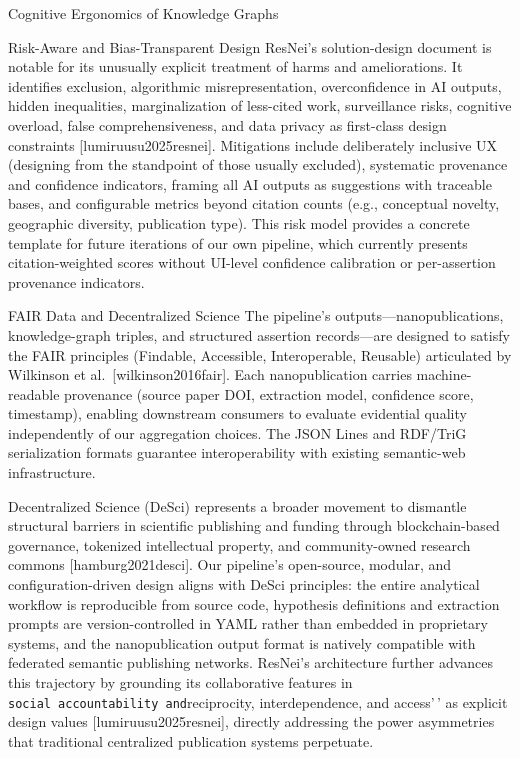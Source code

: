 \documentclass[
  ignorenonframetext,
]{beamer}
\providecommand{\citep}[1]{[#1]}
\begin{document}
\begin{frame}[allowframebreaks]{Cognitive Ergonomics of Knowledge
Graphs}
\begin{block}{Risk-Aware and Bias-Transparent Design}
\protect{}\label{risk-aware-and-bias-transparent-design}
ResNei's solution-design document is notable for its unusually explicit
treatment of harms and ameliorations. It identifies exclusion,
algorithmic misrepresentation, overconfidence in AI outputs, hidden
inequalities, marginalization of less-cited work, surveillance risks,
cognitive overload, false comprehensiveness, and data privacy as
first-class design constraints \citep{lumiruusu2025resnei}. Mitigations
include deliberately inclusive UX (designing from the standpoint of
those usually excluded), systematic provenance and confidence
indicators, framing all AI outputs as suggestions with traceable bases,
and configurable metrics beyond citation counts (e.g., conceptual
novelty, geographic diversity, publication type). This risk model
provides a concrete template for future iterations of our own pipeline,
which currently presents citation-weighted scores without UI-level
confidence calibration or per-assertion provenance indicators.
\end{block}
\end{frame}

\begin{frame}{FAIR Data and Decentralized
Science}
\protect{}\label{fair-data-and-decentralized-science}
The pipeline's outputs---nanopublications, knowledge-graph triples, and
structured assertion records---are designed to satisfy the FAIR
principles (Findable, Accessible, Interoperable, Reusable) articulated
by Wilkinson et al.~\citep{wilkinson2016fair}. Each nanopublication
carries machine-readable provenance (source paper DOI, extraction model,
confidence score, timestamp), enabling downstream consumers to evaluate
evidential quality independently of our aggregation choices. The JSON
Lines and RDF/TriG serialization formats guarantee interoperability with
existing semantic-web infrastructure.

Decentralized Science (DeSci) represents a broader movement to dismantle
structural barriers in scientific publishing and funding through
blockchain-based governance, tokenized intellectual property, and
community-owned research commons \citep{hamburg2021desci}. Our
pipeline's open-source, modular, and configuration-driven design aligns
with DeSci principles: the entire analytical workflow is reproducible
from source code, hypothesis definitions and extraction prompts are
version-controlled in YAML rather than embedded in proprietary systems,
and the nanopublication output format is natively compatible with
federated semantic publishing networks. ResNei's architecture further
advances this trajectory by grounding its collaborative features in
\texttt{social\ accountability\textquotesingle{}\textquotesingle{}\ and}reciprocity,
interdependence, and access'\,' as explicit design values
\citep{lumiruusu2025resnei}, directly addressing the power asymmetries
that traditional centralized publication systems perpetuate.
\end{frame}
\end{document}
